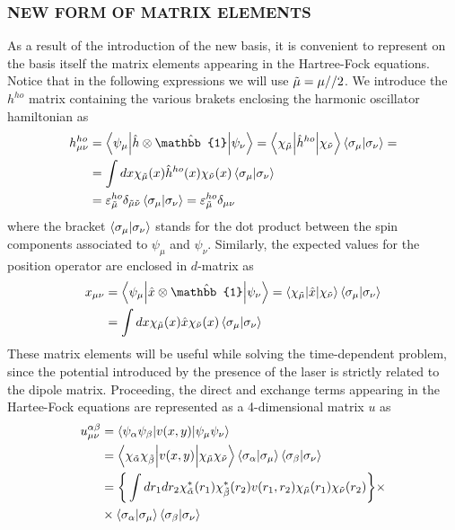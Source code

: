 \subsubsection{NEW FORM OF MATRIX ELEMENTS}
As a result of the introduction of the new basis, it is convenient to represent on the basis itself the matrix elements appearing in the Hartree-Fock equations. Notice that in the following expressions we will use $\Tilde{\mu} = \mu//2$. We introduce the $h^{ho}$ matrix containing the various brakets enclosing the harmonic oscillator hamiltonian as
\begin{align}
    h_{\mu\nu}^{ho} &= \bracketOP{\psi_\mu}{\psi_\nu}{\hat{h} \otimes \hat{\mathbb{1}}} = \bracketOP{\chi_{\Tilde{\mu}}}{\chi_{\Tilde{\nu}}}{\hat{h}^{ho}} \bracket{\sigma_{\mu}}{\sigma_{\nu}} = \nonumber \\
    &= \int dx \chi_{\Tilde{\mu}}(x) \hat{h}^{ho}(x) \chi_{\Tilde{\nu}}(x) \bracket{\sigma_{\mu}}{\sigma_{\nu}} \nonumber \\
    &= \varepsilon_{\Tilde{\mu}}^{ho} \delta_{\Tilde{\mu} \Tilde{\nu} } \bracket{\sigma_{\mu}}{\sigma_{\nu}}  = \varepsilon_{\Tilde{\mu}}^{ho} \delta_{\mu \nu} 
    \label{eq:h_elements}
\end{align}
where the bracket $\left\langle \sigma_{\mu} \middle| \sigma_{\nu} \right\rangle$ stands for the dot product between the spin components associated to $\psi_\mu$ and $\psi_\nu$. Similarly, the expected values for the position operator are enclosed in $d$-matrix as
\begin{align}
    x_{\mu\nu} &= \bracketOP{\psi_\mu}{\psi_\nu}{\hat{x} \otimes \hat{\mathbb{1}}} = 
    \bracketOP{\chi_{\Tilde{\mu}}}{\chi_{\Tilde{\nu}}}{\hat{x}} \braket{\sigma_\mu}{\sigma_\nu} \nonumber \\
    &= \int dx \chi_{\Tilde{\mu}}(x) \hat{x} \chi_{\Tilde{\nu}}(x) \bracket{\sigma_{\mu}}{\sigma_{\nu}} 
    \label{eq:x_elements}
\end{align}
These matrix elements will be useful while solving the time-dependent problem, since the potential introduced by the presence of the laser is strictly related to the dipole matrix. Proceeding, the direct and exchange terms appearing in the Hartee-Fock equations are represented as a 4-dimensional matrix $u$ as
\begin{align}
    u^{\alpha\beta}_{\mu\nu} &= \bracketOP{\psi_{\alpha} \psi_{\beta}}{\psi_{\mu} \psi_{\nu}}{v(x,y)} \nonumber \\
    &= \bracketOP{\chi_{\Tilde{\alpha}} \chi_{\Tilde{\beta}}}{\chi_{\Tilde{\mu}} \chi_{\Tilde{\nu}}}{v(x,y)} \bracket{\sigma_{\alpha}}{\sigma_{\mu}} \bracket{\sigma_{\beta}}{\sigma_{\nu}} \nonumber \\
    &= \bigg\{\int dr_1 dr_2 \chi_{\Tilde{\alpha}}^*(r_1) \chi_{\Tilde{\beta}}^* (r_2) v(r_1,r_2) \chi_{\Tilde{\mu}} (r_1) \chi_{\Tilde{\nu}} (r_2) \bigg\} \times\nonumber  \\
    &\times \bracket{\sigma_{\alpha}}{\sigma_{\mu}} \bracket{\sigma_{\beta}}{\sigma_{\nu}} 
    \label{eq:u_elements}
\end{align}
